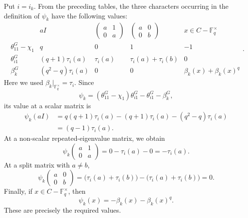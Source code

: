 \documentclass[../Odyssey_Project.tex]{subfiles}
\begin{document}
\begin{solution}
    Put $i=i_k$. From the preceding tables, the three characters occurring in the definition of $\psi_k$ have the following values:
    \[
        \begin{array}{c|cccc}
            &aI&
            \begin{pmatrix}a&1\\0&a\end{pmatrix}&
            \begin{pmatrix}a&0\\0&b\end{pmatrix}&
            x\in C-\mathbb{F}_q^\times\\
            \hline
            \theta_{11}^G-\chi_1
            &q&0&1&-1\\
            \theta_{i1}^G
            &(q+1)\tau_i(a)&\tau_i(a)&\tau_i(a)+\tau_i(b)&0\\
            \beta_k^G
            &(q^2-q)\tau_i(a)&0&0&\beta_k(x)+\beta_k(x)^q
        \end{array}.
    \]
    Here we used $\beta_k|_{\mathbb{F}_q^\times}=\tau_i$. Since
    \[
        \psi_k
        =
        (\theta_{11}^G-\chi_1)\theta_{i1}^G
        -\theta_{i1}^G
        -\beta_k^G,
    \]
    its value at a scalar matrix is
    \begin{align*}
        \psi_k(aI)
        &=
        q(q+1)\tau_i(a)
        -(q+1)\tau_i(a)
        -(q^2-q)\tau_i(a) \\
        &=
        (q-1)\tau_i(a).
    \end{align*}
    At a non-scalar repeated-eigenvalue matrix, we obtain
    \[
        \psi_k
        \begin{pmatrix}
            a&1\\
            0&a
        \end{pmatrix}
        =
        0-\tau_i(a)-0
        =
        -\tau_i(a).
    \]
    At a split matrix with $a\neq b$,
    \[
        \psi_k
        \begin{pmatrix}
            a&0\\
            0&b
        \end{pmatrix}
        =
        \bigl(\tau_i(a)+\tau_i(b)\bigr)
        -\bigl(\tau_i(a)+\tau_i(b)\bigr)
        =
        0.
    \]
    Finally, if $x\in C-\mathbb{F}_q^\times$, then
    \[
        \psi_k(x)=-\beta_k(x)-\beta_k(x)^q.
    \]
    These are precisely the required values.
\end{solution}
\end{document}
